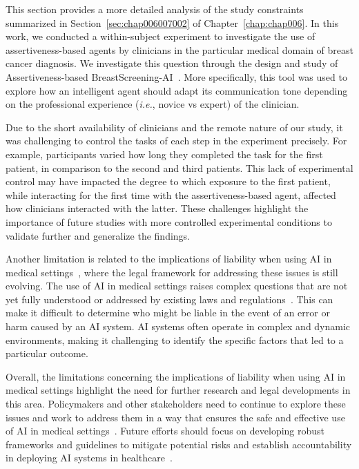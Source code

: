 This section provides a more detailed analysis of the study constraints summarized in Section~\ref{sec:chap006007002} of Chapter~\ref{chap:chap006}.
In this work, we conducted a within-subject experiment to investigate the use of assertiveness-based agents by clinicians in the particular medical domain of breast cancer diagnosis.
We investigate this question through the design and study of Assertiveness-based BreastScreening-AI~\cite{10.1145/3544548.3580682}.
More specifically, this tool was used to explore how an intelligent agent should adapt its communication tone depending on the professional experience ({\it i.e.}, novice vs expert) of the clinician.

Due to the short availability of clinicians and the remote nature of our study, it was challenging to control the tasks of each step in the experiment precisely.
For example, participants varied how long they completed the task for the first patient, in comparison to the second and third patients.
This lack of experimental control may have impacted the degree to which exposure to the first patient, while interacting for the first time with the assertiveness-based agent, affected how clinicians interacted with the latter.
These challenges highlight the importance of future studies with more controlled experimental conditions to validate further and generalize the findings.

Another limitation is related to the implications of liability when using \ac{AI} in medical settings~\cite{10.1145/3555157}, where the legal framework for addressing these issues is still evolving.
The use of \ac{AI} in medical settings raises complex questions that are not yet fully understood or addressed by existing laws and regulations~\cite{10.1145/3411764.3445432}.
This can make it difficult to determine who might be liable in the event of an error or harm caused by an \ac{AI} system.
\ac{AI} systems often operate in complex and dynamic environments, making it challenging to identify the specific factors that led to a particular outcome.

Overall, the limitations concerning the implications of liability when using \ac{AI} in medical settings highlight the need for further research and legal developments in this area.
Policymakers and other stakeholders need to continue to explore these issues and work to address them in a way that ensures the safe and effective use of \ac{AI} in medical settings~\cite{10.1145/3544549.3573827}.
Future efforts should focus on developing robust frameworks and guidelines to mitigate potential risks and establish accountability in deploying \ac{AI} systems in healthcare~\cite{10.1145/3544548.3581393}.

